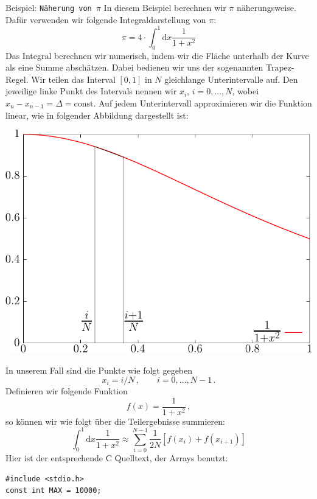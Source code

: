 \begin{myexampleprogram}{Beispiel: \texttt{Näherung von $\pi$}}
  In diesem Beispiel berechnen wir $\pi$ näherungsweise.
  Dafür verwenden wir folgende Integraldarstellung von $\pi$:
  \begin{equation}
    \pi=4\cdot \int_{0}^{1} \mathrm{d}x \dfrac{1}{1+x^2}
  \end{equation}
  Das Integral berechnen wir numerisch, indem wir die Fläche unterhalb der Kurve als eine Summe abschätzen.
  Dabei bedienen wir uns der sogenannten Trapez-Regel.
  Wir teilen das Interval $[0,1]$ in $N$ gleichlange Unterintervalle auf.
  Den jeweilige linke Punkt des Intervals nennen wir $x_i$, $i=0,...,N$, wobei $x_n-x_{n-1}=\Delta=\mathrm{const}$.
  Auf jedem Unterintervall approximieren wir die Funktion linear, wie in folgender Abbildung dargestellt ist:
  \begin{center}
    \includegraphics[width=.6\linewidth]{trapez1}
  \end{center}
  In unserem Fall sind die Punkte wie folgt gegeben
  \begin{displaymath}
    x_i = i/N\,,\qquad i = 0, ..., N-1\,.
  \end{displaymath}
  Definieren wir folgende Funktion
  \[
  f(x) = \frac{1}{1+x^2}\,,
  \]
  so können wir wie folgt über die Teilergebnisse summieren:
  \begin{equation}
    \int_{0}^{1} \mathrm{d}x \dfrac{1}{1+x^2}\approx \sum_{i=0}^{N-1}\frac{1}{2N}[f(x_i)+f(x_{i+1})]
  \end{equation}
  Hier ist der entsprechende C Quelltext, der Arrays benutzt:
\begin{lstlisting}
#include <stdio.h>
const int MAX = 10000;


\end{lstlisting}
\end{myexampleprogram}
